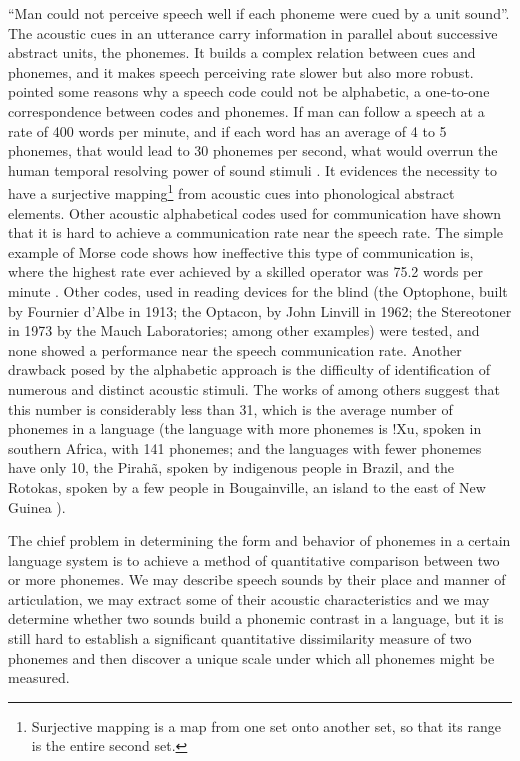 ``Man could not perceive speech well if each phoneme were cued by a unit sound''\citep{liberman1967}. The acoustic cues in an utterance carry information in parallel about successive abstract units, the phonemes. It builds a complex relation between cues and phonemes, and it makes speech perceiving rate slower but also more robust. \cite{liberman1967} pointed some reasons why a speech code could not be alphabetic, a one-to-one correspondence between codes and phonemes. If man can follow a speech at a rate of 400 words per minute, and if each word has an average of 4 to 5 phonemes, that would lead to 30 phonemes per second, what would overrun the human temporal resolving power of sound stimuli \citep{miller1948}. It evidences the necessity to have a surjective mapping\footnote{Surjective mapping is a map from one set onto another set, so that its range is the entire second set.} from acoustic cues into phonological abstract elements. Other acoustic alphabetical codes used for communication have shown that it is hard to achieve a communication rate near the speech rate. The simple example of Morse code shows how ineffective this type of communication is, where the highest rate ever achieved by a skilled operator was 75.2 words per minute \citep{pierpont2002}. Other codes, used in reading devices for the blind (the Optophone, built by Fournier d'Albe in 1913; the Optacon, by John Linvill in 1962; the Stereotoner in 1973 by the Mauch Laboratories; among other examples) were tested, and none showed a performance near the speech communication rate. Another drawback posed by the alphabetic approach is the difficulty of identification of numerous and distinct acoustic stimuli. The works of \cite{miller1956,pollack1952} among others suggest that this number is considerably less than 31, which is the average number of phonemes in a language (the language with more phonemes is !Xu, spoken in southern Africa, with 141 phonemes; and the languages with fewer phonemes have only 10, the Pirah\~a, spoken by indigenous people in Brazil, and the Rotokas, spoken by a few people in Bougainville, an island to the east of New Guinea \citep{maddieson1884}).

The chief problem in determining the form and behavior of phonemes in a certain language system is to achieve a method of quantitative comparison between two or more phonemes. We may describe speech sounds by their place and manner of articulation, we may extract some of their acoustic characteristics and we may determine whether two sounds build a phonemic contrast in a language, but it is still hard to establish a significant quantitative dissimilarity measure of two phonemes and then discover a unique scale under which all phonemes might be measured. 

